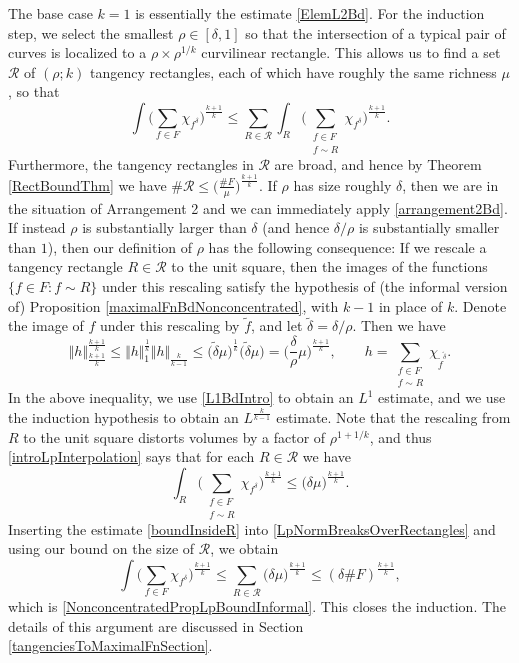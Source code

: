 \documentclass[letterpaper, reqno,11pt]{article}
\numberwithin{equation}{section}
\numberwithin{thm}{section}
\theoremstyle{remark}
\begin{document}
The base case $k=1$ is essentially the estimate \eqref{ElemL2Bd}. For the induction step, we select the smallest $\rho\in[\delta,1]$ so that the intersection of a typical pair of curves is localized to a $\rho\times\rho^{1/k}$ curvilinear rectangle. This allows us to find a set $\mathcal{R}$ of $(\rho;k)$ tangency rectangles, each of which have roughly the same richness $\mu$, so that
\begin{equation}\label{LpNormBreaksOverRectangles}
\int \Big(\sum_{f\in F} \chi_{f^\delta} \Big)^{\frac{k+1}{k}} \leq \sum_{R\in\mathcal{R}}\int_R \Big(\sum_{\substack{f\in F \\ f \sim R}} \chi_{f^\delta}\Big)^{\frac{k+1}{k}}.
\end{equation}
Furthermore, the tangency rectangles in $\mathcal{R}$ are broad, and hence by Theorem \ref{RectBoundThm} we have $
\#\mathcal{R}\leq \big(\frac{\#F}{\mu}\big)^{\frac{k+1}{k}}.$
%
If $\rho$ has size roughly $\delta$, then we are in the situation of Arrangement 2 and we can immediately apply \eqref{arrangement2Bd}. If instead $\rho$ is substantially larger than $\delta$ (and hence $\delta/\rho$ is substantially smaller than $1$), then our definition of $\rho$ has the following consequence: If we rescale a tangency rectangle $R\in\mathcal{R}$ to the unit square, then the images of the functions $\{f\in F\colon f \sim R\}$ under this rescaling satisfy the hypothesis of (the informal version of) Proposition \ref{maximalFnBdNonconcentrated}, with $k-1$ in place of $k$. Denote the image of $f$ under this rescaling by $\tilde f$, and let $\tilde \delta=\delta/\rho$. Then we have 
%
\begin{equation}\label{introLpInterpolation}
\Vert h\Vert_{\frac{k+1}{k}}^{\frac{k+1}{k}}  
\leq \Vert h\Vert_{1}^{\frac{1}{k}} \Vert h\Vert_{\frac{k}{k-1}} 
\leq \Big(\tilde\delta \mu \Big)^{\frac{1}{k}}\Big( \tilde\delta\mu \Big)
=\big(\frac{\delta}{\rho}\mu\big)^{\frac{k+1}{k}},\qquad h = \sum_{\substack{f\in F \\ f \sim R}} \chi_{\tilde f^{\tilde \delta}}.
\end{equation}
%
In the above inequality, we use \eqref{L1BdIntro} to obtain an $L^1$ estimate, and we use the induction hypothesis to obtain an $L^{\frac{k}{k-1}}$ estimate. Note that the rescaling from $R$ to the unit square distorts volumes by a factor of $\rho^{1+1/k}$, and thus \eqref{introLpInterpolation} says that for each $R\in\mathcal{R}$ we have
\begin{equation}\label{boundInsideR}
\int_R \Big(\sum_{\substack{f\in F \\ f \sim R}} \chi_{f^\delta}\Big)^{\frac{k+1}{k}}\leq \big(\delta\mu)^{\frac{k+1}{k}}.
\end{equation}
Inserting the estimate \eqref{boundInsideR} into \eqref{LpNormBreaksOverRectangles} and using our bound on the size of $\mathcal{R}$, we obtain 
\[
\int \Big(\sum_{f\in F} \chi_{f^\delta} \Big)^{\frac{k+1}{k}}
\leq \sum_{R\in\mathcal{R}}\big(\delta\mu)^{\frac{k+1}{k}}
\leq (\delta\#F)^{\frac{k+1}{k}},
\]
which is \eqref{NonconcentratedPropLpBoundInformal}. This closes the induction. The details of this argument are discussed in Section \ref{tangenciesToMaximalFnSection}.
\end{document}
